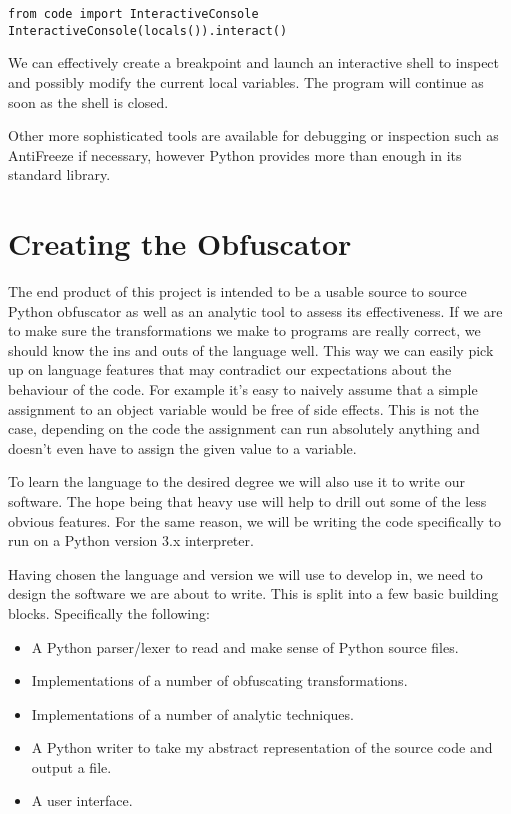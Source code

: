 \documentclass{report}
\begin{document}
\begin{lstlisting}
from code import InteractiveConsole
InteractiveConsole(locals()).interact()
\end{lstlisting}

We can effectively create a breakpoint and launch an interactive shell to inspect and possibly modify the current local
variables. The program will continue as soon as the shell is closed.

Other more sophisticated tools are available for debugging or inspection such as AntiFreeze \cite{pirates} if necessary,
however Python provides more than enough in its standard library.

\section{Creating the Obfuscator}

The end product of this project is intended to be a usable source to source Python obfuscator as well as an analytic tool
to assess its effectiveness. If we are to make sure the transformations we make to programs are really correct, we should
know the ins and outs of the language well. This way we can easily pick up on language features that may contradict our
expectations about the behaviour of the code. For example it's easy to naively assume that a simple assignment to an object
variable would be free of side effects. This is not the case, depending on the code the assignment can run absolutely
anything \cite{pyprop} and doesn't even have to assign the given value to a variable.

To learn the language to the desired degree we will also use it to write our software. The hope being that heavy use will help to
drill out some of the less obvious features. For the same reason, we will be writing the code specifically to run on a Python version 3.x
interpreter.

Having chosen the language and version we will use to develop in, we need to design the software we are about to write. This is split into a few basic building
blocks. Specifically the following:

\begin{itemize}
\item A Python parser/lexer to read and make sense of Python source files.
\item Implementations of a number of obfuscating transformations.
\item Implementations of a number of analytic techniques.
\item A Python writer to take my abstract representation of the source code and output a file.
\item A user interface.
\end{itemize}
\end{document}
